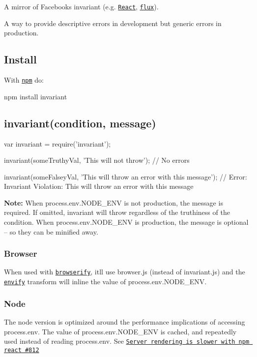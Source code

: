 \href{https://travis-ci.org/zertosh/invariant}{\tt }

A mirror of Facebook\textquotesingle{}s {\ttfamily invariant} (e.\+g. \href{https://github.com/facebook/react/blob/v0.13.3/src/vendor/core/invariant.js}{\tt React}, \href{https://github.com/facebook/flux/blob/2.0.2/src/invariant.js}{\tt flux}).

A way to provide descriptive errors in development but generic errors in production.

\subsection*{Install}

With \href{http://npmjs.org}{\tt npm} do\+:


\begin{DoxyCode}
npm install invariant
\end{DoxyCode}


\subsection*{{\ttfamily invariant(condition, message)}}


\begin{DoxyCode}
var invariant = require('invariant');

invariant(someTruthyVal, 'This will not throw');
// No errors

invariant(someFalseyVal, 'This will throw an error with this message');
// Error: Invariant Violation: This will throw an error with this message
\end{DoxyCode}


{\bfseries Note\+:} When {\ttfamily process.\+env.\+N\+O\+D\+E\+\_\+\+E\+NV} is not {\ttfamily production}, the message is required. If omitted, {\ttfamily invariant} will throw regardless of the truthiness of the condition. When {\ttfamily process.\+env.\+N\+O\+D\+E\+\_\+\+E\+NV} is {\ttfamily production}, the message is optional – so they can be minified away.

\subsubsection*{Browser}

When used with \href{https://github.com/substack/node-browserify}{\tt browserify}, it\textquotesingle{}ll use {\ttfamily browser.\+js} (instead of {\ttfamily invariant.\+js}) and the \href{https://github.com/hughsk/envify}{\tt envify} transform will inline the value of {\ttfamily process.\+env.\+N\+O\+D\+E\+\_\+\+E\+NV}.

\subsubsection*{Node}

The node version is optimized around the performance implications of accessing {\ttfamily process.\+env}. The value of {\ttfamily process.\+env.\+N\+O\+D\+E\+\_\+\+E\+NV} is cached, and repeatedly used instead of reading {\ttfamily process.\+env}. See \href{https://github.com/facebook/react/issues/812}{\tt Server rendering is slower with npm react \#812} 